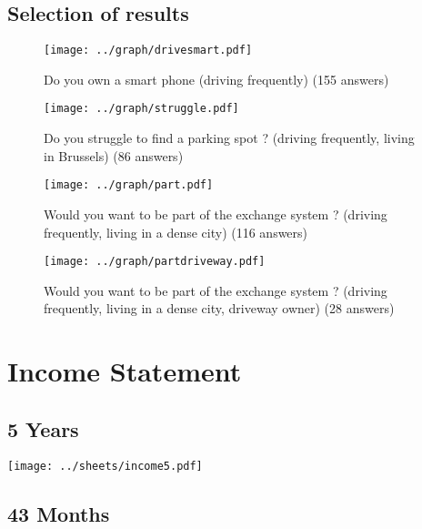 \documentclass[12pt,a4paper,oneside]{book}
\begin{document}
\section{Selection of results}

\begin{figure}[h]
\centering
\caption{Do you own a smart phone (driving frequently) (155 answers)}
\label{drivesmartres}
\texttt{[image: ../graph/drivesmart.pdf]}
\end{figure}

\begin{figure}[h]
\centering
\caption{Do you struggle to find a parking spot ? (driving frequently, living in Brussels) (86 answers)}
\label{struggleres}
\texttt{[image: ../graph/struggle.pdf]}
\end{figure}

\begin{figure}[h]
\centering
\caption{Would you want to be part of the exchange system ? (driving frequently, living in a dense city) (116 answers)}
\label{partres}
\texttt{[image: ../graph/part.pdf]}
\end{figure}

\begin{figure}[h]
\centering
\caption{Would you want to be part of the exchange system ? (driving frequently, living in a dense city, driveway owner) (28 answers)}
\label{pratdrivewayres}
\texttt{[image: ../graph/partdriveway.pdf]}
\end{figure}

\chapter{Income Statement}
\label{is}

\section{5 Years}
\begin{center}
\texttt{[image: ../sheets/income5.pdf]}
\end{center}
\section{43 Months}

\end{document}

